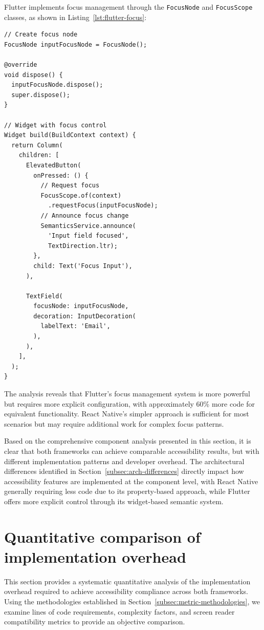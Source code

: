 Flutter implements focus management through the \texttt{FocusNode} and \texttt{FocusScope} classes, as shown in Listing~\ref{lst:flutter-focus}:

\begin{lstlisting}[style=DartStyle, caption=Focus management in Flutter, label=lst:flutter-focus]
// Create focus node
FocusNode inputFocusNode = FocusNode();

@override
void dispose() {
  inputFocusNode.dispose();
  super.dispose();
}

// Widget with focus control
Widget build(BuildContext context) {
  return Column(
    children: [
      ElevatedButton(
        onPressed: () {
          // Request focus
          FocusScope.of(context)
            .requestFocus(inputFocusNode);
          // Announce focus change
          SemanticsService.announce(
            'Input field focused',
            TextDirection.ltr);
        },
        child: Text('Focus Input'),
      ),
      
      TextField(
        focusNode: inputFocusNode,
        decoration: InputDecoration(
          labelText: 'Email',
        ),
      ),
    ],
  );
}
\end{lstlisting}

The analysis reveals that Flutter's focus management system is more powerful but requires more explicit configuration, with approximately 60\% more code for equivalent functionality. React Native's simpler approach is sufficient for most scenarios but may require additional work for complex focus patterns.

Based on the comprehensive component analysis presented in this section, it is clear that both frameworks can achieve comparable accessibility results, but with different implementation patterns and developer overhead. The architectural differences identified in Section~\ref{subsec:arch-differences} directly impact how accessibility features are implemented at the component level, with React Native generally requiring less code due to its property-based approach, while Flutter offers more explicit control through its widget-based semantic system.

\section{Quantitative comparison of implementation overhead}
\label{sec:quantitative-comparison}

This section provides a systematic quantitative analysis of the implementation overhead required to achieve accessibility compliance across both frameworks. Using the methodologies established in Section~\ref{subsec:metric-methodologies}, we examine lines of code requirements, complexity factors, and screen reader compatibility metrics to provide an objective comparison.

